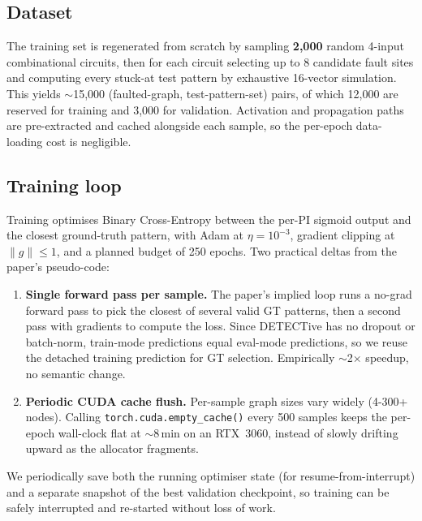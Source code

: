 \documentclass[11pt,a4paper]{article}
\newcommand{\code}[1]{\texttt{#1}}
\newcommand{\bd}[1]{\textbf{#1}}
\begin{document}
\subsection{Dataset}

The training set is regenerated from scratch by sampling
\textbf{2{,}000} random 4-input combinational circuits, then for each
circuit selecting up to 8 candidate fault sites and computing every
stuck-at test pattern by exhaustive 16-vector simulation. This yields
$\sim$15{,}000 (faulted-graph, test-pattern-set) pairs, of which
12{,}000 are reserved for training and 3{,}000 for validation.
Activation and propagation paths are pre-extracted and cached
alongside each sample, so the per-epoch data-loading cost is
negligible.

\subsection{Training loop}

Training optimises Binary Cross-Entropy between the per-PI sigmoid
output and the closest ground-truth pattern, with Adam at
$\eta = 10^{-3}$, gradient clipping at $\|g\|\le 1$, and a planned
budget of 250 epochs. Two practical deltas from the paper's
pseudo-code:

\begin{enumerate}[leftmargin=*,itemsep=2pt]
  \item \bd{Single forward pass per sample.} The paper's implied loop
        runs a no-grad forward pass to pick the closest of several
        valid GT patterns, then a second pass with gradients to compute
        the loss. Since DETECTive has no dropout or batch-norm,
        train-mode predictions equal eval-mode predictions, so we
        reuse the detached training prediction for GT selection.
        Empirically $\sim$2$\times$ speedup, no semantic change.
  \item \bd{Periodic CUDA cache flush.} Per-sample graph sizes vary
        widely (4-300+ nodes). Calling
        \code{torch.cuda.empty\_cache()} every 500 samples keeps the
        per-epoch wall-clock flat at $\sim$8\,min on an RTX~3060,
        instead of slowly drifting upward as the allocator
        fragments.
\end{enumerate}

We periodically save both the running optimiser state (for
resume-from-interrupt) and a separate snapshot of the best validation
checkpoint, so training can be safely interrupted and re-started
without loss of work.
\end{document}

